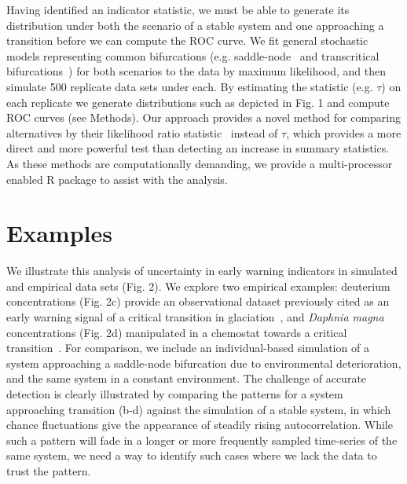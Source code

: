 \documentclass{pnastwo}
\begin{document}
\begin{article}
Having identified an indicator statistic,
we must be able to generate its distribution under both the scenario of a stable system and 
one approaching a transition before we can compute the ROC curve.
We fit general stochastic models representing common bifurcations
(e.g. saddle-node~\cite{Scheffer2009, Guttal2008a, VanNes2007, Biggs2009} and transcritical bifurcations~\cite{Drake2010})
for both scenarios to the data by maximum likelihood, and then simulate 500 replicate data sets under each⁠. 
By estimating the statistic (e.g. $\tau$) on each replicate we generate distributions such as depicted in Fig. 1 and compute ROC curves (see Methods).
Our approach provides a novel method for comparing alternatives by their likelihood ratio statistic~\cite{Cox1961}⁠ instead of $\tau$,
which provides a more direct and more powerful test than detecting an increase in summary statistics.
As these methods are computationally demanding, we provide a multi-processor enabled R package to assist with the analysis. 

\section{Examples}

We illustrate this analysis of uncertainty in early warning indicators in simulated and empirical data sets (Fig. 2). 
We explore two empirical examples:
deuterium concentrations (Fig. 2c) provide an observational dataset previously cited as an early warning signal of a critical transition in glaciation~\cite{Dakos2008},
and \emph{Daphnia magna} concentrations (Fig. 2d) manipulated in a chemostat towards a critical transition~\cite{Drake2010}.  
For comparison, we include an individual-based simulation of a system approaching a saddle-node bifurcation due to environmental deterioration,
and the same system in a constant environment. 
The challenge of accurate detection is clearly illustrated by comparing the patterns for a system approaching transition (b-d) 
against the simulation of a stable system, in which chance fluctuations give the appearance of steadily rising autocorrelation. 
While such a pattern will fade in a longer or more frequently sampled time-series of the same system, 
we need a way to identify such cases where we lack the data to trust the pattern.  


\end{article}
\end{document}

